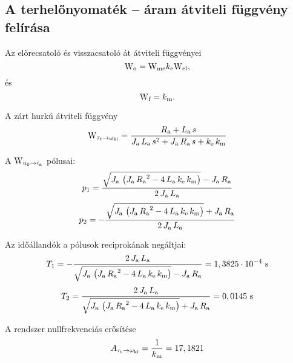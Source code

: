 \subsection{A terhelőnyomaték -- áram átviteli függvény felírása}
\label{subsect:Wt-i}

Az előrecsatoló és visszacsatoló át átviteli függvényei
\begin{equation}
	\mathrm{W}_\text{o} = \mathrm{W}_\text{me}k_\text{e}\mathrm{W}_\text{el},
\end{equation} és 
\begin{equation}
	\mathrm{W}_\text{f} = k_\text{m}.
\end{equation}

A zárt hurkú átviteli függvény
\begin{equation}
	\mathrm{W}_{\tau_\text{t}\rightarrow\omega_\text{ki}} = 
	\frac{R_\text{a} + L_\text{a}\, s}{J_\text{a}\, L_\text{a}\, s^2 + J_\text{a}\, R_\text{a}\, s + k_\text{e}\, k_\text{m}}
\end{equation}

A $\mathrm{W}_{u_0\rightarrow i_\text{a}}$ pólusai:
\begin{equation}
	p_1 = \frac{\sqrt{J_\text{a}\, \left(J_\text{a}\, {R_\text{a}}^2 - 4\, L_\text{a}\, k_\text{e}\, k_\text{m}\right)} - J_\text{a}\, R_\text{a}}{2\, J_\text{a}\, L_\text{a}}
\end{equation}
\begin{equation}
	p_2 = -\frac{\sqrt{J_\text{a}\, \left(J_\text{a}\, {R_\text{a}}^2 - 4\, L_\text{a}\, k_\text{e}\, k_\text{m}\right)} + J_\text{a}\, R_\text{a}}{2\, J_\text{a}\, L_\text{a}}
\end{equation}

Az időállandók a pólusok reciprokának negáltjai:
\begin{equation}
	T_1 = -\frac{2\, J_\text{a}\, L_\text{a}}{\sqrt{J_\text{a}\, \left(J_\text{a}\, {R_\text{a}}^2 - 4\, L_\text{a}\, k_\text{e}\, k_\text{m}\right)} - J_\text{a}\, R_\text{a}} = 1,3825\cdot10^{-4}\text{ s}
\end{equation}
\begin{equation}
	T_2 = \frac{2\, J_\text{a}\, L_\text{a}}{\sqrt{J_\text{a}\, \left(J_\text{a}\, {R_\text{a}}^2 - 4\, L_\text{a}\, k_\text{e}\, k_\text{m}\right)} + J_\text{a}\, R_\text{a}} = 0,0145\text{ s}
\end{equation}

A rendszer nullfrekvenciás erősítése
\begin{equation}
	A_{\tau_\text{t}\rightarrow\omega_\text{ki}} = \frac{1}{k_\text{m}} = 17,1821
\end{equation}


